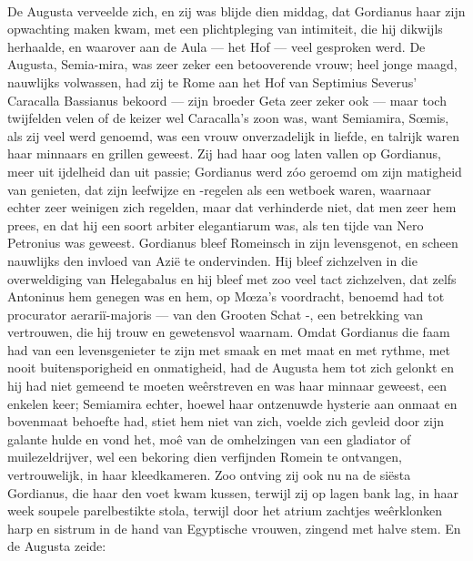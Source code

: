 \documentclass[a4paper, 12pt, oneside, dutch]{article}
\begin{document}
\paragraph{}
De Augusta verveelde zich, en zij was blijde dien middag, dat Gordianus haar zijn opwachting maken kwam, met een plichtpleging van intimiteit, die hij dikwijls herhaalde, en waarover aan de Aula --- het Hof --- veel gesproken werd. De Augusta, Semia-mira, was zeer zeker een betooverende vrouw; heel jonge maagd, nauwlijks volwassen, had zij te Rome aan het Hof van Septimius Severus' Caracalla Bassianus bekoord --- zijn broeder Geta zeer zeker ook --- maar toch twijfelden velen of de keizer wel Caracalla's zoon was, want Semiamira, Sœmis, als zij veel werd genoemd, was een vrouw onverzadelijk in liefde, en talrijk waren haar minnaars en grillen geweest. Zij had haar oog laten vallen op Gordianus, meer uit ijdelheid dan uit passie; Gordianus werd zóo geroemd om zijn matigheid van genieten, dat zijn leefwijze en -regelen als een wetboek waren, waarnaar echter zeer weinigen zich regelden, maar dat verhinderde niet, dat men zeer hem prees, en dat hij een soort arbiter elegantiarum was, als ten tijde van Nero Petronius was geweest. Gordianus bleef Romeinsch in zijn levensgenot, en scheen nauwlijks den invloed van Azië te ondervinden. Hij bleef zichzelven in die overweldiging van Helegabalus en hij bleef met zoo veel tact zichzelven, dat zelfs Antoninus hem genegen was en hem, op Mœza's voordracht, benoemd had tot procurator aerariï-majoris --- van den Grooten Schat -, een betrekking van vertrouwen, die hij trouw en gewetensvol waarnam. Omdat Gordianus die faam had van een levensgenieter te zijn met smaak en met maat en met rythme, met nooit buitensporigheid en onmatigheid, had de Augusta hem tot zich gelonkt en hij had niet gemeend te moeten weêrstreven en was haar minnaar geweest, een enkelen keer; Semiamira echter, hoewel haar ontzenuwde hysterie aan onmaat en bovenmaat behoefte had, stiet hem niet van zich, voelde zich gevleid door zijn galante hulde en vond het, moê van de omhelzingen van een gladiator of muilezeldrijver, wel een bekoring dien verfijnden Romein te ontvangen, vertrouwelijk, in haar kleedkameren. Zoo ontving zij ook nu na de siësta Gordianus, die haar den voet kwam kussen, terwijl zij op lagen bank lag, in haar week soupele parelbestikte stola, terwijl door het atrium zachtjes weêrklonken harp en sistrum in de hand van Egyptische vrouwen, zingend met halve stem. En de Augusta zeide:
\end{document}
